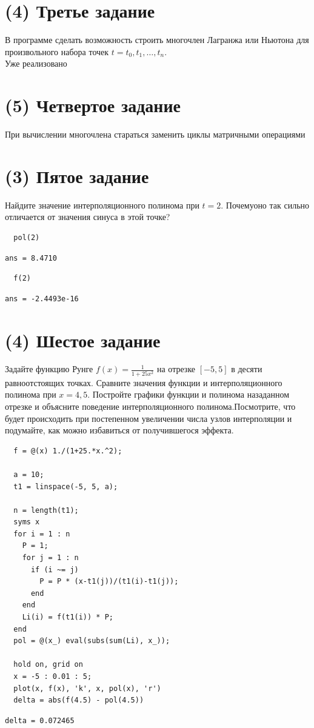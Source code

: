 \section{(4) Третье задание}
В программе сделать возможность строить многочлен Лагранжа или Ньютона для произвольного набора точек $t = t_{0}, t_{1}, \ldots, t_{n}$.\\[2mm]
Уже реализовано


\section{(5) Четвертое задание}
При вычислении многочлена стараться заменить циклы матричными операциями


\section{(3) Пятое задание}
Найдите значение интерполяционного полинома при $t = 2$. Почемуоно так сильно отличается от значения синуса в этой точке?\\[2mm]
\begin{lstlisting}
  pol(2)
\end{lstlisting}

\begin{lstlisting}[backgroundcolor=\color{cyan}]
  ans = 8.4710
\end{lstlisting}

\begin{lstlisting}
  f(2)
\end{lstlisting}

\begin{lstlisting}[backgroundcolor=\color{cyan}]
  ans = -2.4493e-16
\end{lstlisting}

\section{(4) Шестое задание}
Задайте функцию Рунге $f(x) = \frac{1}{1+25x^{2}}$ на отрезке $\left[-5, 5\right]$ в десяти равноотстоящих точках. Сравните значения функции и интерполяционного полинома при $x=4,5$. Постройте графики функции и полинома назаданном отрезке и объясните поведение интерполяционного полинома.Посмотрите, что будет происходить при постепенном увеличении числа узлов интерполяции и подумайте, как можно избавиться от получившегося эффекта.\\[2mm]

\begin{lstlisting}
  f = @(x) 1./(1+25.*x.^2);

  a = 10;
  t1 = linspace(-5, 5, a);

  n = length(t1);
  syms x
  for i = 1 : n
    P = 1;
    for j = 1 : n
      if (i ~= j)
        P = P * (x-t1(j))/(t1(i)-t1(j));
      end
    end
    Li(i) = f(t1(i)) * P;
  end
  pol = @(x_) eval(subs(sum(Li), x_));

  hold on, grid on
  x = -5 : 0.01 : 5;
  plot(x, f(x), 'k', x, pol(x), 'r')
  delta = abs(f(4.5) - pol(4.5))
\end{lstlisting}
\begin{lstlisting}[backgroundcolor=\color{cyan}]
  delta = 0.072465
\end{lstlisting}

